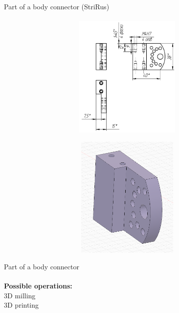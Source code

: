 \documentclass[aspectratio=169]{beamer}
\begin{document}
\begin{frame}[c]{Part of a body connector (StriRus)}
\framesubtitle{}
    \vspace{-0.6cm}
    \begin{figure}[H]
        \begin{subfigure}{0.49\textwidth}
            \centering\includegraphics[height=6cm,width=1\textwidth,keepaspectratio]{stri_1.png}
            \label{fig:stri_1.png}
        \end{subfigure}
        \begin{subfigure}{0.49\textwidth}
            \centering\includegraphics[height=6cm,width=1\textwidth,keepaspectratio]{stri1_det.png}
            \label{fig:stri1_det.png}
        \end{subfigure}
    
    \end{figure}
\end{frame}

\begin{frame}[c]{Part of a body connector}
    \framesubtitle{}
        \LARGE \centering
        \textbf{Possible operations: } \\ 
        3D milling\\
        3D printing
    \end{frame}
\end{document}
